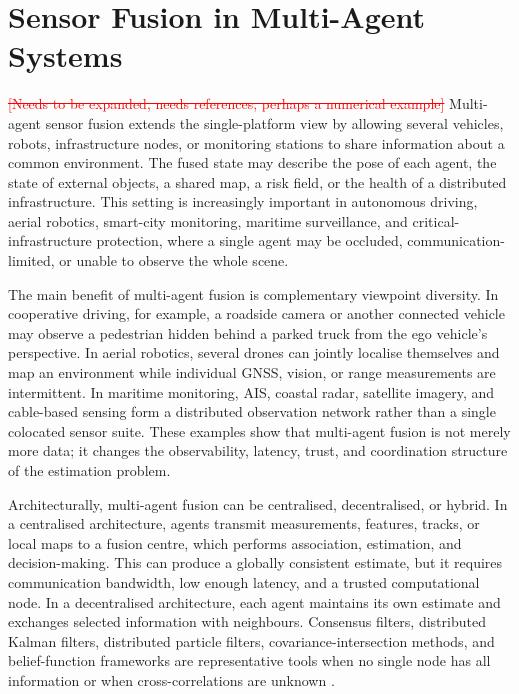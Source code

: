 \documentclass[11pt,oneside,openany]{book}
\newcommand{\deleted}[1]{\textcolor{red}{\sout{#1}}}
\begin{document}
\chapter{Sensor Fusion in Multi-Agent Systems}
\label{sec:MAS}
\deleted{[Needs to be expanded, needs references, perhaps a numerical example]} %
Multi-agent sensor fusion extends the single-platform view by allowing several vehicles, robots, infrastructure nodes, or monitoring stations to share information about a common environment. The fused state may describe the pose of each agent, the state of external objects, a shared map, a risk field, or the health of a distributed infrastructure. This setting is increasingly important in autonomous driving, aerial robotics, smart-city monitoring, maritime surveillance, and critical-infrastructure protection, where a single agent may be occluded, communication-limited, or unable to observe the whole scene.

The main benefit of multi-agent fusion is complementary viewpoint diversity. In cooperative driving, for example, a roadside camera or another connected vehicle may observe a pedestrian hidden behind a parked truck from the ego vehicle's perspective. In aerial robotics, several drones can jointly localise themselves and map an environment while individual GNSS, vision, or range measurements are intermittent. In maritime monitoring, AIS, coastal radar, satellite imagery, and cable-based sensing form a distributed observation network rather than a single colocated sensor suite. These examples show that multi-agent fusion is not merely more data; it changes the observability, latency, trust, and coordination structure of the estimation problem.

Architecturally, multi-agent fusion can be centralised, decentralised, or hybrid. In a centralised architecture, agents transmit measurements, features, tracks, or local maps to a fusion centre, which performs association, estimation, and decision-making. This can produce a globally consistent estimate, but it requires communication bandwidth, low enough latency, and a trusted computational node. In a decentralised architecture, each agent maintains its own estimate and exchanges selected information with neighbours. Consensus filters, distributed Kalman filters, distributed particle filters, covariance-intersection methods, and belief-function frameworks are representative tools when no single node has all information or when cross-correlations are unknown \cite{khaleghi_multisensor_2013,foglietta_networked_2012}.
\end{document}
